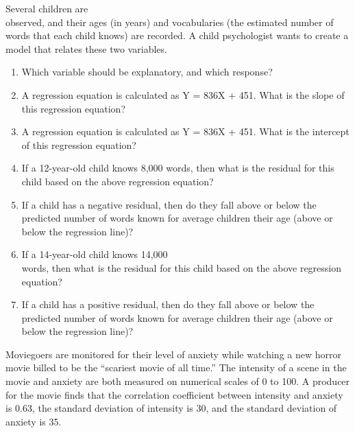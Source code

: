 \documentclass[11pt, chapterprefix=true]{scrbook}\usepackage[]{graphicx}\usepackage[]{color}
\begin{document}
\begin{exercises}
\begin{exercise}
Several children are \\ observed, and their ages (in years) and vocabularies (the estimated number of words that each child knows) are recorded. A child psychologist wants to create a model that relates these two variables.

\begin{enumerate}
  \item Which variable should be explanatory, and which response?
  \item A regression equation is calculated as Y = 836X + 451. What is the slope of this regression equation?
  \item A regression equation is calculated as Y = 836X + 451. What is the intercept of this regression equation?
  \item	If a 12-year-old child knows 8,000 words, then what is the residual for this child based on the above regression equation?
  \item	If a child has a negative residual, then do they fall above or below the predicted number of words known for average children their age (above or below the regression line)?
  \item	If a 14-year-old child knows 14,000 \\ words, then what is the residual for this child based on the above regression \\ equation?
  \item	If a child has a positive residual, then do they fall above or below the predicted number of words known for average children their age (above or below the regression line)?
\end{enumerate}

\end{exercise}
\begin{solution} %

\end{solution}

\begin{exercise} %

Moviegoers are monitored for their level of anxiety while watching a new horror movie billed to be the “scariest movie of all time.” The intensity of a scene in the movie and anxiety are both measured on numerical scales of 0 to 100. A producer for the movie finds that the correlation coefficient between intensity and anxiety is 0.63, the standard deviation of intensity is 30, and the standard deviation of anxiety is 35.


\end{exercise}
\end{exercises}
\end{document}
